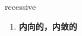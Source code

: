 
\begin{frame}
{\huge recessive}
\begin{center}
\begin{enumerate}\Large
  \item \textbf{内向的，内敛的}
\end{enumerate}
\end{center}
\end{frame}
